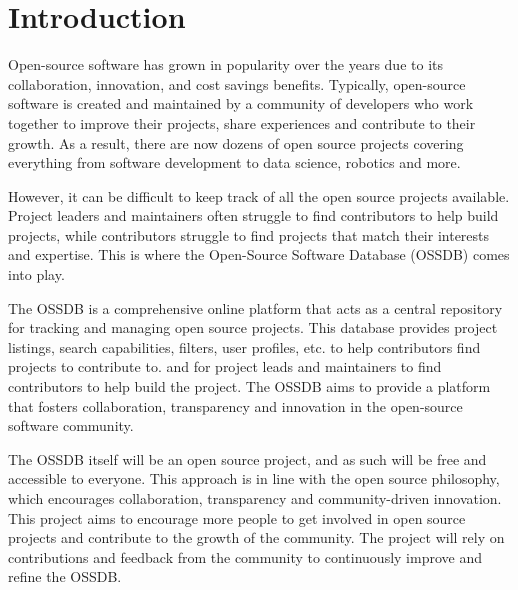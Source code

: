 \pagebreak
\section{Introduction}
Open-source software has grown in popularity over the years due to its collaboration, innovation, and cost savings benefits.
Typically, open-source software is created and maintained by a community of developers who work together to improve their projects, share experiences and contribute to their growth.
As a result, there are now dozens of open source projects covering everything from software development to data science, robotics and more.

However, it can be difficult to keep track of all the open source projects available.
Project leaders and maintainers often struggle to find contributors to help build projects, while contributors struggle to find projects that match their interests and expertise.
This is where the Open-Source Software Database (OSSDB) comes into play.

The OSSDB is a comprehensive online platform that acts as a central repository for tracking and managing open source projects.
This database provides project listings, search capabilities, filters, user profiles, etc. to help contributors find projects to contribute to.
and for project leads and maintainers to find contributors to help build the project.
The OSSDB aims to provide a platform that fosters collaboration, transparency and innovation in the open-source software community.

The OSSDB itself will be an open source project, and as such will be free and accessible to everyone.
This approach is in line with the open source philosophy, which encourages collaboration, transparency and community-driven innovation.
This project aims to encourage more people to get involved in open source projects and contribute to the growth of the community.
The project will rely on contributions and feedback from the community to continuously improve and refine the OSSDB.
